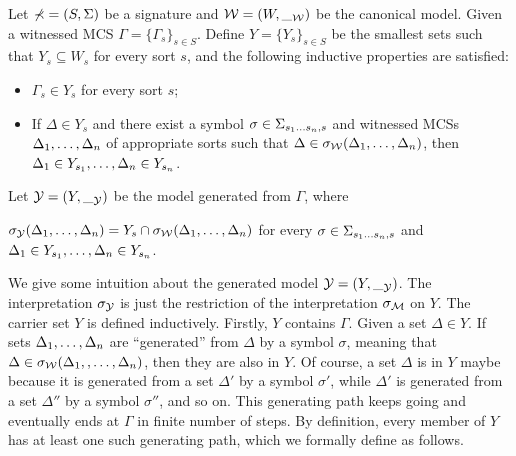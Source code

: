 \documentclass{amsart}
\begin{document}
\begin{definition}
\label{def_generated_models}
Let $\mathbb{\Sigma} = (S,\Sigma)$ be a signature and
$\mathcal{W} = (W,\__{\mathcal{W}})$ be the canonical model.
Given a witnessed MCS $\Gamma = \{ \Gamma_s \}_{s \in S}$.
Define $Y = \{Y_s\}_{s \in S}$ 
be the smallest sets such that
$Y_s \subseteq W_s$ for every sort $s$, and
the following inductive properties are satisfied:
\begin{itemize}
\item $\Gamma_s \in Y_s$ for every sort $s$;
\item If $\Delta \in Y_s$
      and there exist a symbol 
      $\sigma \in \Sigma_{s_1 \dots s_n, s}$ and 
      witnessed MCSs $\Delta_1 ,\dots, \Delta_n$ of appropriate sorts
      such that
      $\Delta \in \sigma_{\mathcal{W}}(\Delta_1,\dots,\Delta_n)$,
      then $\Delta_1 \in Y_{s_1} ,\dots, \Delta_n \in Y_{s_n}$. 
\end{itemize}
Let $\mathcal{Y} = (Y, \__{\mathcal{Y}})$ 
be the model generated from $\Gamma$, where
\begin{center}
${\sigma_{\mathcal{Y}}} (\Delta_1 ,\dots, \Delta_n) =
  Y_s \cap {\sigma_{\mathcal{W}}}(\Delta_1 ,\dots, \Delta_n)$
\quad for every $\sigma \in \Sigma_{s_1 \dots s_n, s}$ and
      $\Delta_1 \in Y_{s_1} ,\dots, \Delta_n \in Y_{s_n}$.
\end{center}
\end{definition}

We give some intuition about the generated model $\mathcal{Y} = (Y, \__{\mathcal{Y}})$.
The interpretation ${\sigma_{\mathcal{Y}}}$ is just the restriction of 
the interpretation ${\sigma_{\mathcal{M}}}$ on $Y$.
The carrier set $Y$ is defined inductively.
Firstly, $Y$ contains $\Gamma$.
Given a set $\Delta \in Y$.
If sets
$\Delta_1 ,\dots, \Delta_n$ 
are ``generated'' from $\Delta$ by a symbol $\sigma$,
meaning that 
$\Delta \in {\sigma_{\mathcal{W}}}(\Delta_1, ,\dots, \Delta_n)$,
then they are also in $Y$.
Of course, a set $\Delta$ is in $Y$
maybe because it is generated
from a set $\Delta'$ by a symbol $\sigma'$,
while $\Delta'$ is generated 
from a set $\Delta''$ by a symbol $\sigma''$, and so on.
This generating path keeps going
and eventually ends at $\Gamma$ in finite number of steps.
By definition, every member of $Y$ has at least one such generating path,
which we formally define as follows.
\end{document}
